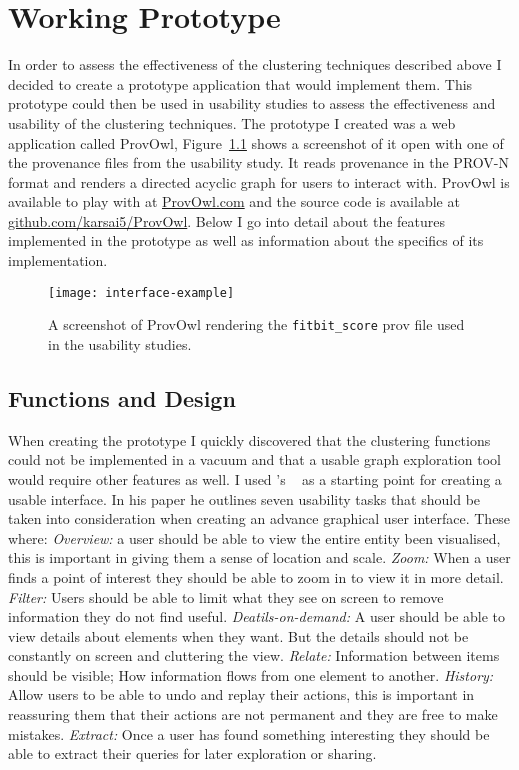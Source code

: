 \chapter{Working Prototype}

In order to assess the effectiveness of the clustering techniques described above I decided to create a prototype application that would implement them. This prototype could then be used in usability studies to assess the effectiveness and usability of the clustering techniques. The prototype I created was a web application called ProvOwl, Figure~\ref{fig:interface-example} shows a screenshot of it open with one of the provenance files from the usability study. It reads provenance in the PROV-N format and renders a directed acyclic graph for users to interact with. ProvOwl is available to play with at \href{http://provowl.com/?file=prov-examples/provn/fitbit_score.provn}{ProvOwl.com} and the source code is available at \href{https://github.com/karsai5/ProvOwl}{github.com/karsai5/ProvOwl}. Below I go into detail about the features implemented in the prototype as well as information about the specifics of its implementation.

\begin{figure}[h]
\centering
\texttt{[image: interface-example]}
\caption{A screenshot of ProvOwl rendering the \texttt{fitbit\_score} prov file used in the usability studies.}
\label{fig:interface-example}
\end{figure}

\section{Functions and Design}

When creating the prototype I quickly discovered that the clustering functions could not be implemented in a vacuum and that a usable graph exploration tool would require other features as well. I used \citeauthor{Shneiderman1996}'s ~\cite{Shneiderman1996} as a starting point for creating a usable interface. In his paper he outlines seven usability tasks that should be taken into consideration when creating an advance graphical user interface. These where: \textit{Overview:} a user should be able to view the entire entity been visualised, this is important in giving them a sense of location and scale. \textit{Zoom:} When a user finds a point of interest they should be able to zoom in to view it in more detail. \textit{Filter:} Users should be able to limit what they see on screen to remove information they do not find useful. \textit{Deatils-on-demand:} A user should be able to view details about elements when they want. But the details should not be constantly on screen and cluttering the view. \textit{Relate:} Information between items should be visible; How information flows from one element to another. \textit{History:} Allow users to be able to undo and replay their actions, this is important in reassuring them that their actions are not permanent and they are free to make mistakes. \textit{Extract:} Once a user has found something interesting they should be able to extract their queries for later exploration or sharing.

